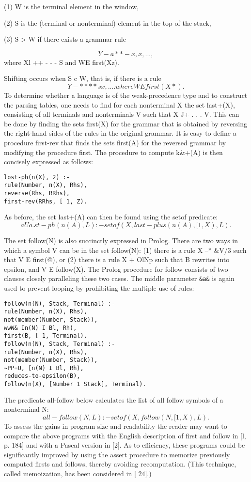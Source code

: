 (1) W is the terminal element in the window,

(2) S is the (terminal or nonterminal) element in the top of the stack,

(3) S > W if there exists a grammar rule

\[Y-a **- x,x,...,\]
where Xl ++ - - - S and WE first(Xz). 

Shifting occurs when S c W, that is, if there is a rule
\[Y-* *** sx, . . . . where W E first(X*).\]
To determine whether a language is of the weak-precedence type and to construct
the parsing tables, one needs to find for each nonterminal X the set last+(X),
consisting of all terminals and nonterminals V such that X J+ . . . V. This can
be done by finding the sets first(X) for the grammar that is obtained by reversing
the right-hand sides of the rules in the original grammar. It is easy to define a
procedure first-rev that finds the sets first(A) for the reversed grammar by
modifying the procedure first. The procedure to compute k\&+(A) is then
concisely expressed as follows:
\begin{verbatim}
lost-ph(n(X), 2) :-
rule(Number, n(X), Rhs),
reverse(Rhs, RRhs),
first-rev(RRhs, [ 1, Z).  
\end{verbatim}
As before, the set last+(A) can then be found using the setof predicate:
\[aUo.st-ph(n(A), L) :- setof(X, last-plus(n(A), [ 1, X), L).\]

The set follow(N) is also succinctly expressed in Prolog. There are two ways
in which a symbol V can be in the set follow(N): (1) there is a rule X --* \&V/3
such that V E first(@), or (2) there is a rule X + OlNp such that B rewrites into
epsilon, and V E follow(X). The Prolog procedure for follow consists of two
clauses closely paralleling these two cases. The middle parameter \verb|&a&| is
again used to prevent looping by prohibiting the multiple use of rules:
\begin{verbatim}
follow(n(N), Stack, Terminal) :-
rule(Number, n(X), Rhs),
not(member(Number, Stack)),
wwW& In(N) I Bl, Rh),
first(B, [ 1, Terminal).
follow(n(N), Stack, Terminal) :-
rule(Number, n(X), Rhs),
not(member(Number, Stack)),
~PP=U, [n(N) I Bl, Rh),
reduces-to-epsilon(B),
follow(n(X), [Number 1 Stack], Terminal).  
\end{verbatim}
The predicate all-follow below calculates the list of all follow symbols of a
nonterminal N:
\[all-follow(N, L) :- setof(X, follow(N, [ 1, X), L).\]
To assess the gains in program size and readability the reader may want to
compare the above programs with the English description of first and follow in
[l, p. 184] and with a Pascal version in [2]. As to efficiency, these programs
could be significantly improved by using the assert procedure to memorize previously
computed firsts and follows, thereby avoiding recomputation. (This technique,
called memoization, has been considered in [ 24].)  

